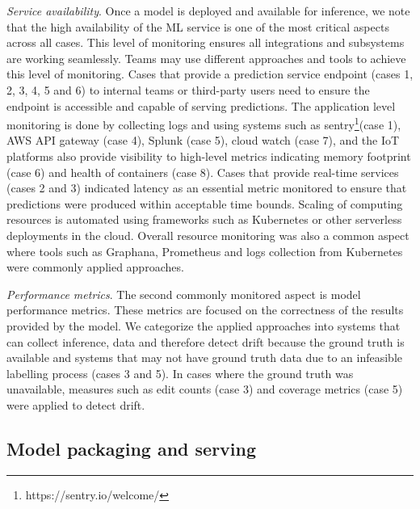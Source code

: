 \textit{Service availability}. Once a model is deployed and available for inference, we note that the high availability of the ML service is one of the most critical aspects across all cases. This level of monitoring ensures all integrations and subsystems are working seamlessly. Teams may use different approaches and tools to achieve this level of monitoring. Cases that provide a prediction service endpoint (cases 1, 2, 3, 4, 5 and 6) to internal teams or third-party users need to ensure the endpoint is accessible and capable of serving predictions. The application level monitoring is done by collecting logs and using systems such as sentry\footnote{https://sentry.io/welcome/}(case 1), AWS API gateway (case 4), Splunk (case 5), cloud watch (case 7), and the IoT platforms also provide visibility to high-level metrics indicating memory footprint (case 6) and health of containers (case 8).
Cases that provide real-time services (cases 2 and 3) indicated latency as an essential metric monitored to ensure that predictions were produced within acceptable time bounds. Scaling of computing resources is automated using frameworks such as Kubernetes or other serverless deployments in the cloud. Overall resource monitoring was also a common aspect where tools such as Graphana, Prometheus and logs collection from Kubernetes were commonly applied approaches.

\textit{Performance metrics}. The second commonly monitored aspect is model performance metrics. These metrics are focused on the correctness of the results provided by the model. We categorize the applied approaches into systems that can collect inference, data and therefore detect drift because the ground truth is available and systems that may not have ground truth data due to an infeasible labelling process (cases 3 and 5). In cases where the ground truth was unavailable, measures such as edit counts (case 3) and coverage metrics (case 5) were applied to detect drift. %


\subsection{Model packaging and serving
}

